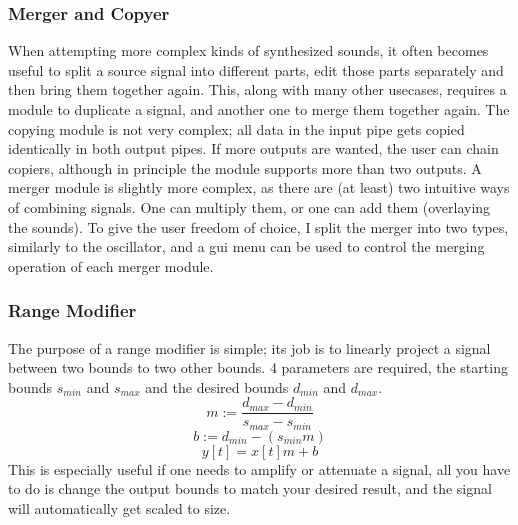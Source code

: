 \documentclass[11pt,a4paper]{article}
\begin{document}
\subsubsection{Merger and Copyer}

When attempting more complex kinds of synthesized sounds, it often becomes useful to split a source signal into different parts, edit those parts separately and then bring them together again. This, along with many other usecases, requires a module to duplicate a signal, and another one to merge them together again. The copying module is not very complex; all data in the input pipe gets copied identically in both output pipes. If more outputs are wanted, the user can chain copiers, although in principle the module supports more than two outputs.
A merger module is slightly more complex, as there are (at least) two intuitive ways of combining signals. One can multiply them, or one can add them (overlaying the sounds). To give the user freedom of choice, I split the merger into two types, similarly to the oscillator, and a gui menu can be used to control the merging operation of each merger module.

\subsubsection{Range Modifier}

The purpose of a range modifier is simple; its job is to linearly project a signal between two bounds to two other bounds. 4 parameters are required, the starting bounds $s_{min}$ and $s_{max}$ and the desired bounds $d_{min}$ and $d_{max}$.
\begin{equation}
m := \frac{d_{max} - d_{min}}{s_{max} - s_{min}}
\end{equation}
\begin{equation}
b := d_{min} - (s_{min}m)
\end{equation}
\begin{equation}
y[t] = x[t]m + b
\end{equation}
This is especially useful if one needs to amplify or attenuate a signal, all you have to do is change the output bounds to match your desired result, and the signal will automatically get scaled to size.
\end{document}

